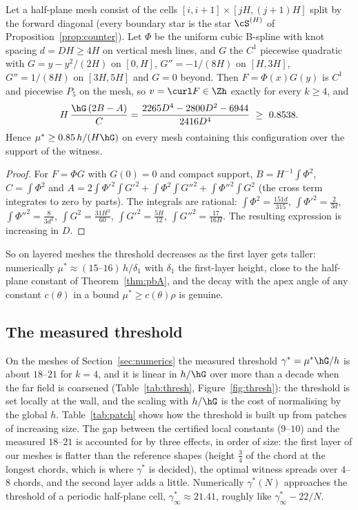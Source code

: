 \begin{proposition}\label{prop:cols}
Let a half-plane mesh consist of the cells $[i,i+1]\times[jH,(j+1)H]$ split by the forward diagonal (every boundary star is the star $\cS^{(H)}$ of Proposition~\ref{prop:counter}). Let $\Phi$ be the uniform cubic B-spline with knot spacing $d=DH\ge4H$ on vertical mesh lines, and $G$ the $C^1$ piecewise quadratic with $G=y-y^2/(2H)$ on $[0,H]$, $G''=-1/(8H)$ on $[H,3H]$, $G''=1/(8H)$ on $[3H,5H]$ and $G=0$ beyond. Then $F=\Phi(x)G(y)$ is $C^1$ and piecewise $P_5$ on the mesh, so $v=\curl F\in\Zh$ exactly for every $k\ge4$, and
\[
H\,\frac{\hG\,(2B-A)}{C}=\frac{2265D^4-2800D^2-6944}{2416D^4}\ \ge\ 0.8538 .
\]
Hence $\mu^\ast\ge0.85\,h/(H\hG)$ on every mesh containing this configuration over the support of the witness.
\end{proposition}

\begin{proof}
For $F=\Phi G$ with $G(0)=0$ and compact support, $B=H^{-1}\int\Phi^2$, $C=\int\Phi^2$ and $A=2\int\Phi'^2\int G'^2+\int\Phi^2\int G''^2+\int\Phi''^2\int G^2$ (the cross term integrates to zero by parts). The integrals are rational: $\int\Phi^2=\frac{151d}{315}$, $\int\Phi'^2=\frac2{3d}$, $\int\Phi''^2=\frac8{3d^3}$, $\int G^2=\frac{31H^3}{60}$, $\int G'^2=\frac{5H}{12}$, $\int G''^2=\frac{17}{16H}$. The resulting expression is increasing in $D$.
\end{proof}

So on layered meshes the threshold decreases as the first layer gets taller: numerically $\mu^\ast\approx(15\text{--}16)\,h/\delta_1$ with $\delta_1$ the first-layer height, close to the half-plane constant of Theorem~\ref{thm:pbA}, and the decay with the apex angle of any constant $c(\theta)$ in a bound $\mu^\ast\ge c(\theta)\rho$ is genuine.

\subsection{The measured threshold}
On the meshes of Section~\ref{sec:numerics} the measured threshold $\gamma^\ast=\mu^\ast\hG/h$ is about $18$--$21$ for $k=4$, and it is linear in $h/\hG$ over more than a decade when the far field is coarsened (Table~\ref{tab:thresh}, Figure~\ref{fig:thresh}): the threshold is set locally at the wall, and the scaling with $h/\hG$ is the cost of normalising by the global $h$. Table~\ref{tab:patch} shows how the threshold is built up from patches of increasing size. The gap between the certified local constants ($9$--$10$) and the measured $18$--$21$ is accounted for \cite{PadhiExt} by three effects, in order of size: the first layer of our meshes is flatter than the reference shapes (height $\frac34$ of the chord at the longest chords, which is where $\gamma^\ast$ is decided), the optimal witness spreads over $4$--$8$ chords, and the second layer adds a little. Numerically $\gamma^\ast(N)$ approaches the threshold of a periodic half-plane cell, $\gamma^\ast_\infty\approx21.41$, roughly like $\gamma^\ast_\infty-22/N$.


